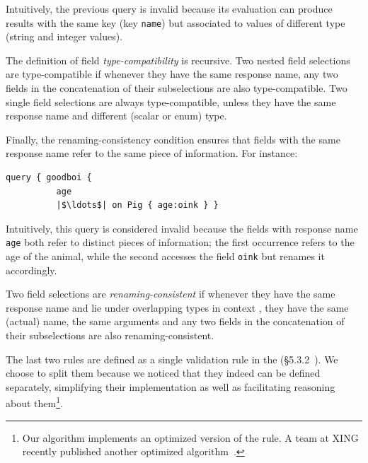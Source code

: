 Intuitively, the previous query is invalid because its evaluation can produce results with the same key 
(key \texttt{name}) but associated to values of different type (string and integer values).

The definition of field \emph{type-compatibility} is recursive. Two nested
field selections are type-compatible if whenever
they have the same response name, any two fields in the concatenation of their
subselections are also type-compatible. Two single field selections
are always type-compatible, unless they have the same response
name and different (scalar or enum) type.

Finally, the renaming-consistency condition ensures that fields with
the same response name refer to the same piece of information. For
instance:
\begin{verbatim}
query { goodboi {
          age   
          |$\ldots$| on Pig { age:oink } }
\end{verbatim}

Intuitively, this query is considered invalid because the fields with response name \texttt{age} both refer to distinct pieces of information;
the first occurrence refers to the age of the animal, while the second accesses the field \texttt{oink} but renames it accordingly.


Two field selections are \emph{renaming-consistent} if whenever they have the
same response name and lie under overlapping types in context
,
they have the same (actual) name, the same arguments and any two
fields in the concatenation of their subselections are also
renaming-consistent.

The last two rules are defined as a single validation rule in the \spec (\cf\S5.3.2~\cite{gqlspec}). 
We choose to split them because we noticed that they indeed can be defined separately, simplifying their implementation as well as facilitating 
reasoning about them\footnote{Our algorithm implements an optimized version of the rule. A team at XING recently published another optimized algorithm~\cite{xingalg}.}.


